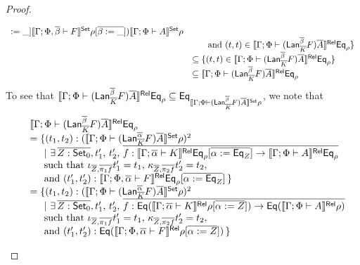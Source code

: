 \documentclass[acmsmall,review,anonymous]{acmart}
\theoremstyle{definition}
\begin{document}
\begin{proof}
\begin{itemize}
{\[\begin{array}{ll}
{{    := \_]}} \llbracket{\Gamma;\Phi,\overline{\beta} \vdash F}\rrbracket^{\mathsf{Set}}\rho[\overline{\beta :=
    \_}])\llbracket{\Gamma;\Phi \vdash A}\rrbracket^{\mathsf{Set}}\rho\\
&\hspace*{0.2in}\mbox{ and } (t,t) \in \llbracket{\Gamma;\Phi \vdash
  (\mathsf{Lan}_{\overline{K}}^{\overline{\beta}} F)\overline{A}}\rrbracket^{\mathsf{Rel}}\mathsf{Eq}_\rho\}\\
&\subseteq \{ (t,t) \in \llbracket{\Gamma;\Phi \vdash
  (\mathsf{Lan}_{\overline{K}}^{\overline{\beta}} F)\overline{A}}\rrbracket^{\mathsf{Rel}}\mathsf{Eq}_\rho\}\\
&\subseteq \llbracket{\Gamma;\Phi \vdash (\mathsf{Lan}_{\overline{K}}^{\overline{\beta}}
  F)\overline{A}}\rrbracket^{\mathsf{Rel}}\mathsf{Eq}_\rho\\ 
\end{array}\]
To see that $\llbracket{\Gamma; \Phi \vdash (\mathsf{Lan}_{\overline{K}}^{\overline{\beta}}
  F)\overline{A}}\rrbracket^{\mathsf{Rel}}\mathsf{Eq}_\rho \subseteq \mathsf{Eq}_{\llbracket{\Gamma; \Phi \vdash
    (\mathsf{Lan}_{\overline{K}}^{\overline{\beta}} F)\overline{A}}\rrbracket^{\mathsf{Set}}\rho}$, we note that
\[\begin{array}{ll}
&\llbracket{\Gamma;\Phi \vdash (\mathsf{Lan}_{\overline{K}}^{\overline{\beta}}
  F)\overline{A}}\rrbracket^{\mathsf{Rel}}\mathsf{Eq}_\rho\\
&= \{ (t_1, t_2) : (\llbracket{\Gamma;\Phi \vdash
    (\mathsf{Lan}^{\overline{\alpha}}_{\overline{K}} F)\overline{A}}\rrbracket^{\mathsf{Set}}\rho)^2\\
  &\hspace{0.2in}|~\exists\, \overline{Z : {\mathsf{Set}}_0}, t_1',\, t_2',\,
\overline{ f : \llbracket{\Gamma; \overline{\alpha} \vdash K}\rrbracket^{\mathsf{Rel}}\mathsf{Eq}_\rho[\overline{\alpha := \mathsf{Eq}_Z}] \to
  \llbracket{\Gamma; \Phi \vdash A}\rrbracket^{\mathsf{Rel}}\mathsf{Eq}_\rho}\\
  &\hspace{0.2in}\mbox{such that } \iota_{\overline{Z},\overline{\pi_1 f}}t_1' = t_1,\,
  \kappa_{\overline{Z},\overline{\pi_2 f}}t_2' = t_2,\\
  &  \hspace*{0.2in}\mbox{and } (t_1',t_2') :
  \llbracket{\Gamma; \Phi, \overline{\alpha} \vdash F}\rrbracket^{\mathsf{Rel}}\mathsf{Eq}_\rho[\overline{\alpha :=
      \mathsf{Eq}_Z}]\,\}\\
&= \{ (t_1, t_2) : (\llbracket{\Gamma;\Phi \vdash
    (\mathsf{Lan}^{\overline{\alpha}}_{\overline{K}} F)\overline{A}}\rrbracket^{\mathsf{Set}}\rho)^2\\
  &\hspace{0.2in}|~\exists\, \overline{Z : {\mathsf{Set}}_0}, t_1',\, t_2',\,
\overline{ f : \mathsf{Eq} (\llbracket{\Gamma; \overline{\alpha} \vdash K}\rrbracket^{\mathsf{Rel}}\rho[\overline{\alpha := Z}]) \to
  \mathsf{Eq} (\llbracket{\Gamma; \Phi \vdash A}\rrbracket^{\mathsf{Rel}}\rho)}\\
  &\hspace{0.2in}\mbox{such that } \iota_{\overline{Z},\overline{\pi_1 f}}t_1' = t_1,\,
  \kappa_{\overline{Z},\overline{\pi_2 f}}t_2' = t_2,\\
  &  \hspace*{0.2in}\mbox{and } (t_1',t_2') :
  \mathsf{Eq} (\llbracket{\Gamma; \Phi, \overline{\alpha} \vdash F}\rrbracket^{\mathsf{Rel}}\rho[\overline{\alpha := Z}])\,\}

\end{array}\]}
\end{itemize}
\end{proof}
\end{document}
